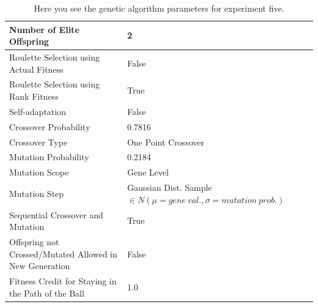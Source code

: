 \documentclass[a4paper,10pt]{article}
\begin{document}
\begin{table}[H]
\footnotesize
\begin{tabular}{ >{\columncolor[gray]{0.8}} l | l }
\hline
Number of Elite Offspring                                            & 2                                                                              \\ \hline
Roulette Selection using Actual Fitness                              & False                                                                          \\ \hline
Roulette Selection using Rank Fitness                                & True                                                                           \\ \hline
Self-adaptation                                                      & False                                                                          \\ \hline
Crossover Probability                                                & 0.7816                                                                         \\ \hline
Crossover Type                                                       & One Point Crossover                                                            \\ \hline
Mutation Probability                                                 & 0.2184                                                                         \\ \hline
Mutation Scope                                                       & Gene Level                                                                     \\ \hline
Mutation Step                                                        & Gaussian Dist. Sample $\in N(\mu=gene \ val., \sigma = mutation \ prob.)$      \\ \hline
Sequential Crossover and Mutation                                    & True                                                      	              \\ \hline
Offspring not Crossed/Mutated Allowed in New Generation              & False                                                     	              \\ \hline
Fitness Credit for Staying in the Path of the Ball                   & 1.0                                                      	              \\ \hline
\end{tabular}
\caption{Here you see the genetic algorithm parameters for experiment five.}
\label{tab:exp5}
\end{table}
\end{document}

